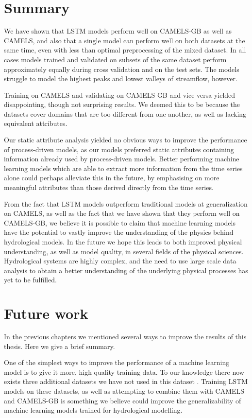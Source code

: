 \section{Summary}
We have shown that LSTM models perform well on CAMELS-GB as well as CAMELS, and 
also that a single model can perform well on both datasets at the same time, even 
with less than optimal preprocessing of the mixed dataset.
In all cases models trained and validated on subsets of the same dataset perform 
approximately equally during cross validation and on the test sets. 
The models struggle to model the highest peaks and lowest valleys of streamflow, 
however. 

Training on CAMELS and validating on CAMELS-GB and vice-versa yielded disappointing, 
though not surprising results. We deemed this to be because the datasets cover 
domains that are too different from one another, as well as lacking equivalent 
attributes.

Our static attribute analysis yielded no obvious ways to improve the performance 
of process-driven models, as our models preferred static attributes containing 
information already used by process-driven models. Better performing 
machine learning models which are able to extract more information from the time 
series alone could perhaps alleviate this in the future, by emphasising on more 
meaningful attributes than those derived directly from the time series. 

From the fact that LSTM models outperform traditional models at generalization on 
CAMELS, as well as the fact that we have shown that they perform well on CAMELS-GB, 
we believe it is possible to claim that machine learning models have the potential 
to vastly improve the understanding of the physics behind hydrological models. 
In the future we hope this leads to both improved physical understanding, 
as well as model quality, in several fields of the physical sciences. Hydrological 
systems are highly complex, and the need to use large scale data analysis to 
obtain a better understanding of the underlying physical processes has yet to be 
fulfilled. 

\section{Future work}
In the previous chapters we mentioned several ways to improve the results of this 
thesis. Here we give a brief summary.

One of the simplest ways to improve the performance of a machine learning model is to give 
it more, high quality training data. To our knowledge there now exists three 
additional datasets we have not used in this dataset \citep{CAMELS_CL, CAMELS_AU, CAMELS_BR}.
Training LSTM models on these datasets, as well as attempting to combine them with 
CAMELS and CAMELS-GB is something we believe could improve the generalizability of 
machine learning models trained for hydrological modelling.

